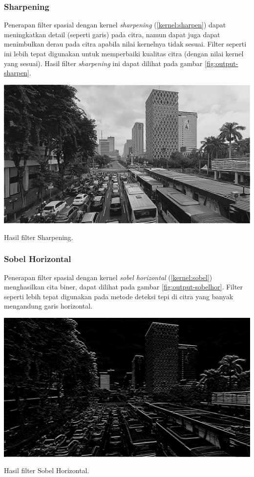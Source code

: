 \subsubsection{Sharpening}
Penerapan filter spasial dengan kernel \textit{sharpening} (\ref{kernel:sharpen}) dapat meningkatkan detail (seperti garis) pada citra, namun dapat juga dapat menimbulkan derau pada citra apabila nilai kernelnya tidak sesuai. Filter seperti ini lebih tepat digunakan untuk memperbaiki kualitas citra (dengan nilai kernel yang sesuai). Hasil filter \textit{sharpening} ini dapat dilihat pada gambar \ref{fig:output-sharpen}.
\begin{afigure}
    \includegraphics[width=0.8\linewidth, center]{images/output-image/input1-sharpen.png}
    \caption{Hasil filter Sharpening.}
    \label{fig:output-sharpen}
\end{afigure}

\subsubsection{Sobel Horizontal}
Penerapan filter spasial dengan kernel \textit{sobel horizontal} (\ref{kernel:sobel}) menghasilkan cita biner, dapat dilihat pada gambar \ref{fig:output-sobelhor}. Filter seperti lebih tepat digunakan pada metode deteksi tepi di citra yang banyak mengandung garis horizontal.
\begin{afigure}
    \includegraphics[width=0.8\linewidth, center]{images/output-image/input1-sobelhor.png}
    \caption{Hasil filter Sobel Horizontal.}
    \label{fig:output-sobelhor}
\end{afigure}

